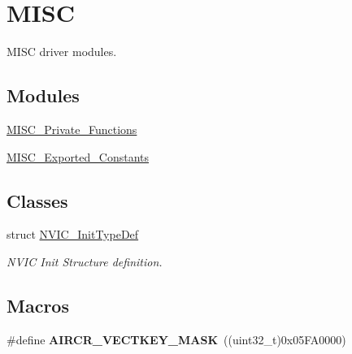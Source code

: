 \hypertarget{group___m_i_s_c}{}\section{M\+I\+S\+C}
\label{group___m_i_s_c}


M\+I\+S\+C driver modules.  


\subsection*{Modules}
\begin{DoxyCompactItemize}
\item 
\hyperlink{group___m_i_s_c___private___functions}{M\+I\+S\+C\+\_\+\+Private\+\_\+\+Functions}
\item 
\hyperlink{group___m_i_s_c___exported___constants}{M\+I\+S\+C\+\_\+\+Exported\+\_\+\+Constants}
\end{DoxyCompactItemize}
\subsection*{Classes}
\begin{DoxyCompactItemize}
\item 
struct \hyperlink{struct_n_v_i_c___init_type_def}{N\+V\+I\+C\+\_\+\+Init\+Type\+Def}
\begin{DoxyCompactList}\small\item\em N\+V\+I\+C Init Structure definition. \end{DoxyCompactList}\end{DoxyCompactItemize}
\subsection*{Macros}
\begin{DoxyCompactItemize}
\item 
\hypertarget{group___m_i_s_c_gad6905141fba3a2d8d5570db40805dc6a}{}\#define {\bfseries A\+I\+R\+C\+R\+\_\+\+V\+E\+C\+T\+K\+E\+Y\+\_\+\+M\+A\+S\+K}~((uint32\+\_\+t)0x05\+F\+A0000)\label{group___m_i_s_c_gad6905141fba3a2d8d5570db40805dc6a}

\end{DoxyCompactItemize}
